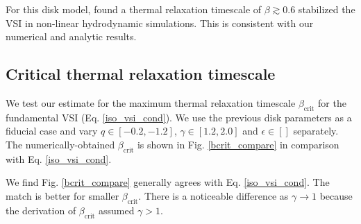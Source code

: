 For this disk model, \citeauthor{nelson13} found a thermal relaxation
timescale of $\beta\gtrsim 0.6$ stabilized the VSI in non-linear
hydrodynamic simulations. This is consistent with our numerical and
analytic results.    

\subsection{Critical thermal relaxation timescale}
We test our estimate for the maximum thermal relaxation timescale 
$\beta_\mathrm{crit}$ for the fundamental
VSI (Eq. \ref{iso_vsi_cond}). We use the previous disk
parameters as a fiducial case and vary $q\in[-0.2,-1.2]$,
$\gamma\in[1.2,2.0]$ and $\epsilon\in[]$
separately. The numerically-obtained $\beta_\mathrm{crit}$ is shown in
Fig. \ref{bcrit_compare} in comparison with Eq. \ref{iso_vsi_cond}.  

We find Fig. \ref{bcrit_compare} generally agrees with
Eq. \ref{iso_vsi_cond}.  The match is better for smaller
$\beta_\mathrm{crit}$. There is a noticeable difference as
$\gamma\to1$ because the  derivation of $\beta_\mathrm{crit}$ assumed
$\gamma>1$.  

